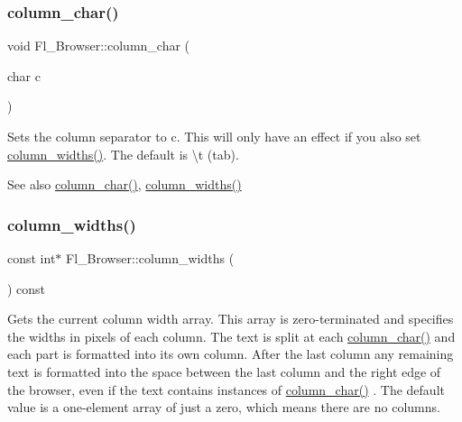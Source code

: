 \subsubsection{\texorpdfstring{column\+\_\+char()}{column\_char()}\hspace{0.1cm}{\footnotesize\ttfamily [2/2]}}
{\footnotesize\ttfamily void Fl\+\_\+\+Browser\+::column\+\_\+char (\begin{DoxyParamCaption}\item[{char}]{c }\end{DoxyParamCaption})\hspace{0.3cm}{\ttfamily [inline]}}

Sets the column separator to c. This will only have an effect if you also set \hyperlink{class_fl___browser_a4a473cbb2e5f5d54b63549704a3a0dd0}{column\+\_\+widths()}. The default is \textquotesingle{}\textbackslash{}t\textquotesingle{} (tab). \begin{DoxySeeAlso}{See also}
\hyperlink{class_fl___browser_ab27dc1a532ccd1c370820229cc1b99f6}{column\+\_\+char()}, \hyperlink{class_fl___browser_a4a473cbb2e5f5d54b63549704a3a0dd0}{column\+\_\+widths()} 
\end{DoxySeeAlso}
\mbox{\label{class_fl___browser_a4a473cbb2e5f5d54b63549704a3a0dd0}} 
\subsubsection{\texorpdfstring{column\+\_\+widths()}{column\_widths()}\hspace{0.1cm}{\footnotesize\ttfamily [1/2]}}
{\footnotesize\ttfamily const int$\ast$ Fl\+\_\+\+Browser\+::column\+\_\+widths (\begin{DoxyParamCaption}{ }\end{DoxyParamCaption}) const\hspace{0.3cm}{\ttfamily [inline]}}

Gets the current column width array. This array is zero-\/terminated and specifies the widths in pixels of each column. The text is split at each \hyperlink{class_fl___browser_ab27dc1a532ccd1c370820229cc1b99f6}{column\+\_\+char()} and each part is formatted into it\textquotesingle{}s own column. After the last column any remaining text is formatted into the space between the last column and the right edge of the browser, even if the text contains instances of \hyperlink{class_fl___browser_ab27dc1a532ccd1c370820229cc1b99f6}{column\+\_\+char()} . The default value is a one-\/element array of just a zero, which means there are no columns.

